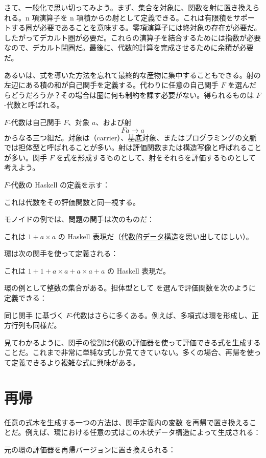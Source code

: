さて、一般化で思い切ってみよう。まず、集合を対象に、関数を射に置き換えられる。n 項演算子を n 項積からの射として定義できる。これは有限積をサポートする圏が必要であることを意味する。零項演算子には終対象の存在が必要だ。したがってデカルト圏が必要だ。これらの演算子を結合するためには指数が必要なので、デカルト閉圏だ。最後に、代数的計算を完成させるために余積が必要だ。

あるいは、式を導いた方法を忘れて最終的な産物に集中することもできる。射の左辺にある積の和が自己関手を定義する。代わりに任意の自己関手 $F$ を選んだらどうだろうか？その場合は圏に何も制約を課す必要がない。得られるものは $F$-代数と呼ばれる。

$F$-代数は自己関手 $F$、対象 $a$、および射
\[F a \to a\]
からなる三つ組だ。対象は（carrier）、基底対象、またはプログラミングの文脈では担体型と呼ばれることが多い。射は評価関数または構造写像と呼ばれることが多い。関手 $F$ を式を形成するものとして、射をそれらを評価するものとして考えよう。

$F$-代数の Haskell の定義を示す：

これは代数をその評価関数と同一視する。

モノイドの例では、問題の関手は次のものだ：

これは $1 + a\times{}a$ の Haskell 表現だ（\hyperref[simple-algebraic-data-types]{代数的データ構造}を思い出してほしい）。

環は次の関手を使って定義される：

これは $1 + 1 + a\times{}a + a\times{}a + a$ の Haskell 表現だ。

環の例として整数の集合がある。担体型として  を選んで評価関数を次のように定義できる：

同じ関手  に基づく $F$-代数はさらに多くある。例えば、多項式は環を形成し、正方行列も同様だ。

見てわかるように、関手の役割は代数の評価器を使って評価できる式を生成することだ。これまで非常に単純な式しか見てきていない。多くの場合、再帰を使って定義できるより複雑な式に興味がある。

\section{再帰}

任意の式木を生成する一つの方法は、関手定義内の変数  を再帰で置き換えることだ。例えば、環における任意の式はこの木状データ構造によって生成される：

元の環の評価器を再帰バージョンに置き換えられる：


